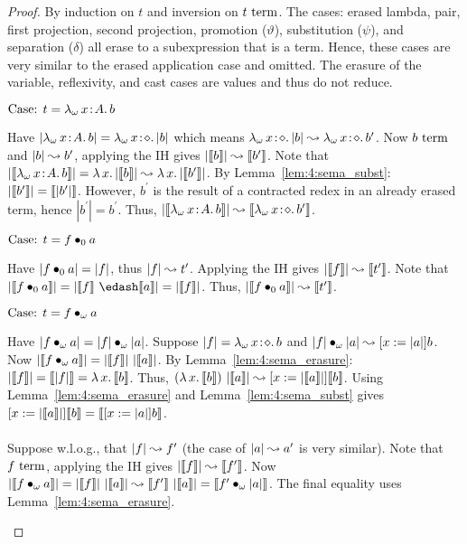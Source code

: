 \begin{proof}
    By induction on $t$ and inversion on $t~\textnormal{term}$.
    The cases: erased lambda, pair, first projection, second projection, promotion ($\vartheta$), substitution ($\psi$), and separation ($\delta$) all erase to a subexpression that is a term.
    Hence, these cases are very similar to the erased application case and omitted.
    The erasure of the variable, reflexivity, and cast cases are values and thus do not reduce.

    $\text{Case: }t = {\lambda_\omega}\, x\! : \! A.\, b$
    \begin{proofcase}
        Have $|{\lambda_\omega}\, x\! : \! A.\, b| = {\lambda_\omega}\, x\! : \! \diamond.\, |b|$ which means ${\lambda_\omega}\, x\! : \! \diamond.\, |b| \leadsto {\lambda_\omega}\, x\! : \! \diamond.\, b^\prime$.
        Now $b~\textnormal{term}$ and $|b| \leadsto b^\prime$, applying the IH gives $|\llbracket b \rrbracket| \leadsto \llbracket b^\prime \rrbracket$.
        Note that $|\llbracket {\lambda_\omega}\, x\! : \! A.\, b \rrbracket| = {\lambda}\, x.\, |\llbracket b \rrbracket| \leadsto {\lambda}\, x.\, |\llbracket b^\prime \rrbracket|$.
        By Lemma~\ref{lem:4:sema_subst}: $|\llbracket b^\prime \rrbracket| = \llbracket |b^\prime| \rrbracket$.
        However, $b^\prime$ is the result of a contracted redex in an already erased term, hence $|b^\prime| = b^\prime$.
        Thus, $|\llbracket {\lambda_\omega}\, x\! : \! A.\, b \rrbracket| \leadsto \llbracket {\lambda_\omega}\, x\! : \! \diamond.\, b^\prime \rrbracket$.
    \end{proofcase}

    $\text{Case: }t = f \bullet_{0} a$
    \begin{proofcase}
        Have $|f \bullet_{0} a| = |f|$, thus $|f| \leadsto t^\prime$.
        Applying the IH gives $|\llbracket f \rrbracket| \leadsto \llbracket t^\prime \rrbracket$.
        Note that $|\sema{\app{f}{0}{a}}| = |\sema{f}\ \edash \sema{a}| = |\sema{f}|$.
        Thus, $|\llbracket f \bullet_{0} a \rrbracket| \leadsto \llbracket t^\prime \rrbracket$.
    \end{proofcase}

    $\text{Case: }t = f \bullet_{\omega} a$
    \begin{proofcase}
        Have $|f \bullet_{\omega} a| = |f| \bullet_{\omega} |a|$.
        Suppose $|f| = {\lambda_\omega}\, x\! : \! \diamond.\, b$ and $|f| \bullet_{\omega} |a| \leadsto [x := |a|]b$.
        Now $|\sema{\app{f}{\omega}{a}}| = |\sema{f}|\ |\sema{a}|$.
        By Lemma~\ref{lem:4:sema_erasure}: $|\llbracket f \rrbracket| = \llbracket |f| \rrbracket = {\lambda}\, x.\, \llbracket b \rrbracket$.
        Thus, $({\lambda}\, x.\, \llbracket b \rrbracket)\ |\llbracket a \rrbracket| \leadsto [x := |\llbracket a \rrbracket|]\llbracket b \rrbracket$.
        Using Lemma~\ref{lem:4:sema_erasure} and Lemma~\ref{lem:4:sema_subst} gives $[x := |\llbracket a \rrbracket|]\llbracket b \rrbracket = \llbracket [x := |a|]b \rrbracket$.
        \\ \\
        Suppose w.l.o.g., that $|f| \leadsto f^\prime$ (the case of $|a| \leadsto a^\prime$ is very similar).
        Note that $f~\textnormal{term}$, applying the IH gives $|\llbracket f \rrbracket| \leadsto \llbracket f^\prime \rrbracket$.
        Now $|\sema{\app{f}{\omega}{a}}| = |\sema{f}|\ |\sema{a}| \betared \sema{f^\prime}\ |\sema{a}| = \sema{\app{f^\prime}{\omega}{|a|}}$.
        The final equality uses Lemma~\ref{lem:4:sema_erasure}.
    \end{proofcase}
\end{proof}

